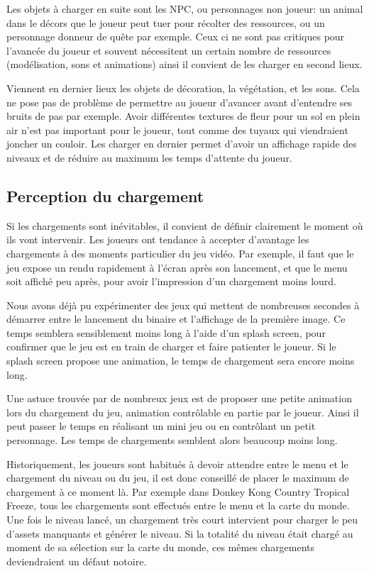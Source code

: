 \documentclass[a4paper, 12pt]{article} %
\begin{document}
Les objets à charger en suite sont les NPC, ou personnages non joueur: un animal dans le décors que le joueur peut tuer pour récolter des ressources, ou un personnage donneur de quête par exemple. Ceux ci ne sont pas critiques pour l'avancée du joueur et souvent nécessitent un certain nombre de ressources (modélisation, sons et animations) ainsi il convient de les charger en second lieux. 

Viennent en dernier lieux les objets de décoration, la végétation, et les sons. Cela ne pose pas de problème de permettre au joueur d'avancer avant d'entendre ses bruits de pas par exemple. Avoir différentes textures de fleur pour un sol en plein air n'est pas important pour le joueur, tout comme des tuyaux qui viendraient joncher un couloir. Les charger en dernier permet d'avoir un affichage rapide des niveaux et de réduire au maximum les temps d'attente du joueur.

\newpage
\subsection{Perception du chargement}
Si les chargements sont inévitables, il convient de définir clairement le moment où ils vont intervenir. Les joueurs ont tendance à accepter d'avantage les chargements à des moments particulier du jeu vidéo. Par exemple, il faut que le jeu expose un rendu rapidement à l'écran après son lancement, et que le menu soit affiché peu après, pour avoir l'impression d'un chargement moins lourd. 

Nous avons déjà pu expérimenter des jeux qui mettent de nombreuses secondes à démarrer entre le lancement du binaire et l'affichage de la première image. Ce temps semblera sensiblement moins long à l'aide d'un splash screen, pour confirmer que le jeu est en train de charger et faire patienter le joueur. Si le splash screen propose une animation, le temps de chargement sera encore moins long.

Une astuce trouvée par de nombreux jeux est de proposer une petite animation lors du chargement du jeu, animation contrôlable en partie par le joueur. Ainsi il peut passer le temps en réalisant un mini jeu ou en contrôlant un petit personnage. Les temps de chargements semblent alors beaucoup moins long.

Historiquement, les joueurs sont habitués à devoir attendre entre le menu et le chargement du niveau ou du jeu, il est donc conseillé de placer le maximum de chargement à ce moment là. Par exemple dans Donkey Kong Country Tropical Freeze, tous les chargements sont effectués entre le menu et la carte du monde. Une fois le niveau lancé, un chargement très court intervient pour charger le peu d'assets manquants et générer le niveau. Si la totalité du niveau était chargé au moment de sa sélection sur la carte du monde, ces mêmes chargements deviendraient un défaut notoire.
\end{document}
